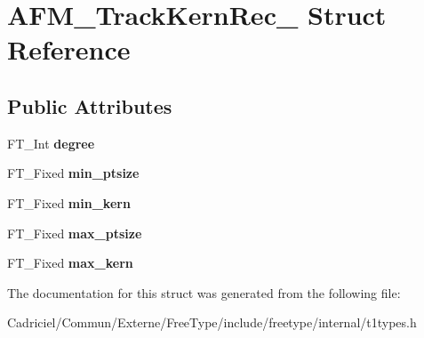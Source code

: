 \hypertarget{struct_a_f_m___track_kern_rec__}{}\section{A\+F\+M\+\_\+\+Track\+Kern\+Rec\+\_\+ Struct Reference}
\label{struct_a_f_m___track_kern_rec__}
\subsection*{Public Attributes}
\begin{DoxyCompactItemize}
\item 
F\+T\+\_\+\+Int {\bfseries degree}\hypertarget{struct_a_f_m___track_kern_rec___a15272593c1a0ea05ca3687e7c2de26b6}{}\label{struct_a_f_m___track_kern_rec___a15272593c1a0ea05ca3687e7c2de26b6}

\item 
F\+T\+\_\+\+Fixed {\bfseries min\+\_\+ptsize}\hypertarget{struct_a_f_m___track_kern_rec___a7b1e7fd74d92dcf2b89fee7f74d4fdba}{}\label{struct_a_f_m___track_kern_rec___a7b1e7fd74d92dcf2b89fee7f74d4fdba}

\item 
F\+T\+\_\+\+Fixed {\bfseries min\+\_\+kern}\hypertarget{struct_a_f_m___track_kern_rec___aee6f40c722e14ee2fb17948ce19d0499}{}\label{struct_a_f_m___track_kern_rec___aee6f40c722e14ee2fb17948ce19d0499}

\item 
F\+T\+\_\+\+Fixed {\bfseries max\+\_\+ptsize}\hypertarget{struct_a_f_m___track_kern_rec___a2b22a268fb0654a035ec59d3dfa3dfa4}{}\label{struct_a_f_m___track_kern_rec___a2b22a268fb0654a035ec59d3dfa3dfa4}

\item 
F\+T\+\_\+\+Fixed {\bfseries max\+\_\+kern}\hypertarget{struct_a_f_m___track_kern_rec___a8e25a36b738a2de3fa5c08e477b5a6a2}{}\label{struct_a_f_m___track_kern_rec___a8e25a36b738a2de3fa5c08e477b5a6a2}

\end{DoxyCompactItemize}


The documentation for this struct was generated from the following file\+:\begin{DoxyCompactItemize}
\item 
Cadriciel/\+Commun/\+Externe/\+Free\+Type/include/freetype/internal/t1types.\+h\end{DoxyCompactItemize}
